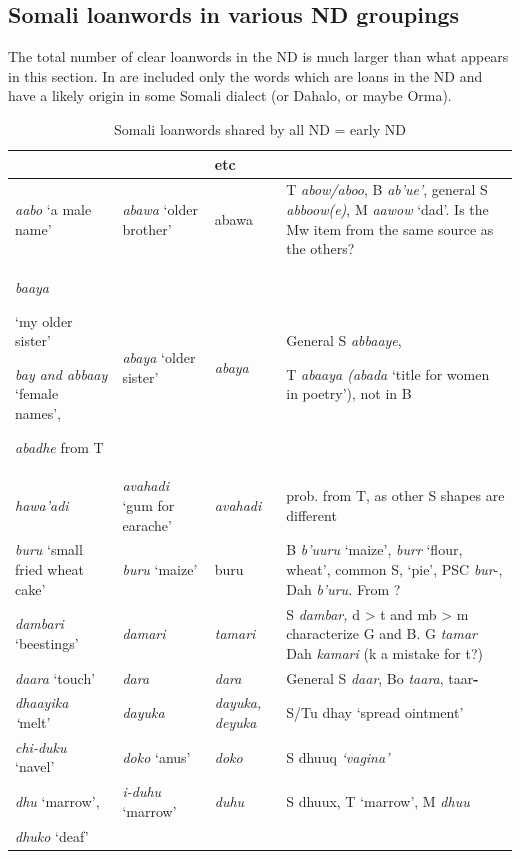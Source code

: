 \documentclass[output=paper
,newtxmath
,modfonts
,nonflat]{langsci/langscibook}
\begin{document}
\subsection{Somali loanwords in various ND groupings}\label{sec:nurse:5.4} The total number of clear loanwords in the ND is much larger than what appears in this section. In  are included only the words which are loans in the ND and have a likely origin in some Somali dialect (or Dahalo, or maybe Orma).

\begin{table}
\footnotesize
\caption{Somali loanwords shared by all ND = early ND}
\label{tab:nurse:2}
\begin{tabularx}{\textwidth}{>{\raggedright}p{2.75cm}>{\raggedright}p{1.5cm}p{1.2cm}Q}
\lsptoprule
{} &  &  etc & \footnotemark{}\\
\midrule
\textit{aabo} ‘a male name’ & \textit{abawa} ‘older brother’ & abawa & T \textit{abow/aboo}, B \textit{ab’ue’}, general S \textit{abboow(e)}, M \textit{aawow} ‘dad’. Is the Mw item from the same source as the others?\\
\textit{baaya}

‘my older sister’

\textit{bay and abbaay} ‘female names’,

\textit{abadhe} from T & \textit{abaya} ‘older sister’ & \textit{abaya} & General S \textit{abbaaye},

T \textit{abaaya  (abada} ‘title for women in poetry’), not in B\\
\textit{hawa’adi}  & \textit{avahadi} ‘gum for earache’ & \textit{avahadi} & prob. from T, as other S shapes are different\\
\textit{buru} ‘small fried wheat cake’ & \textit{buru} ‘maize’ & buru & B \textit{b’uuru} ‘maize’,  \textit{burr} ‘flour, wheat’, common S,  ‘pie’, PSC \textit{bur}{}-, Dah \textit{b’uru.} From ?\\
\textit{dambari} ‘beestings’ & \textit{damari}\footnotemark{} & \textit{tamari} & S \textit{dambar,} d > t and mb > m characterize G and B. G \textit{tamar} Dah \textit{kamari} (k a mistake for t?)\footnotemark{}\\
\textit{daara} ‘touch’ & \textit{dara} & \textit{dara} & General S \textit{daar}, Bo \textit{taara},  taar\textbf{{}-} \\
\textit{dhaayika ‘}melt’ & \textit{dayuka} & \textit{dayuka, deyuka} & S/Tu dhay ‘spread ointment’\\
\textit{chi-d}\textit{uku} ‘navel’ & \textit{doko} ‘anus’ & \textit{doko} & S dhuuq \textit{‘vagina’}\\
\textit{dhu} ‘marrow’, & \textit{i-d}\textit{uhu} ‘marrow’ & \textit{duhu} & S dhuux, T ‘marrow’, M \textit{dhuu}\\
\textit{dhuko} ‘deaf’


\end{tabularx}
\end{table}
\end{document}
